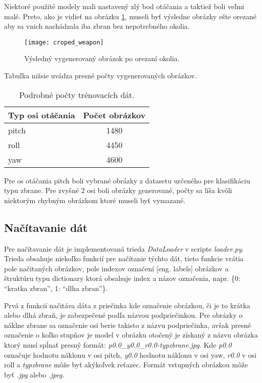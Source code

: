 Niektoré použité modely mali nastavený zlý bod otáčania a taktiež boli veľmi malé.
Preto, ako je vidieť na obrázku \ref{pic:generator3d}, museli byť výsledne obrázky ešte orezané aby sa vnich nachádzala iba zbran bez nepotrebného okolia.

\begin{figure}[H]
    \centering
    \texttt{[image: croped\_weapon]}
    \caption{Výsledný vygenerovaný obrázok po orezaní okolia.}
    \label{pic:generator3d}
\end{figure}

Tabuľka nižsie uvádza presné počty vygenerovaných obrázkov.

\begin{table}[H]
    \centering
    \label{my-label}
    \begin{tabular}{|l|c|}
        \hline
        Typ osi otáčania & \multicolumn{1}{l|}{Počet obrázkov} \\ \hline
        pitch            & 1480                                \\ \hline
        roll             & 4450                                \\ \hline
        yaw              & 4600                                \\ \hline
        \end{tabular}
    \caption{Podrobné počty trénovacích dát.}
\end{table}

Pre os otáčania pitch boli vybrané obrázky z datasetu určeného pre klasifikáciu typu zbrane.
Pre zvyšné 2 osi boli obrázky generované, počty sa líša kvôli niektorým chybným obrázkom ktoré museli byť vymazané.

\subsection{Načítavanie dát}
\label{subsec:nacitaniedat}
Pre načítavanie dát je implementovaná trieda \textit{DataLoader} v scripte \textit{loader.py}.
Trieda obsahuje niekoľko funkcií pre načítanie týchto dát, tieto funkcie vrátia pole načitaných obrázkov, pole indexov označení [eng. labels] obrázkov a
    štruktúru typu dictionary ktorá obsahuje index a názov označenia, napr. \{0: ``kratka zbran'', 1: ``dlha zbran''\}.

Prvá z funkcií načitáva dáta z priečinka kde označenie obrázkou, či je to krátka alebo dlhá zbraň, je zabezpečené podľa názvou podpriečinkou.
Pre obrázky o náklne zbrane sa označenie osi berie takisto z názvu podpriečinka, avšak presné označenie o koľko stupňov je model v obrázku otočený
    je získaný z názvu obrázka ktorý musí spĺnať presný formát: \textit{p0.0\_y0.0\_r0.0-typzbrane.jpg}.
Kde \textit{p0.0} označuje hodnotu náklonu v osi pitch, \textit{y0.0} hodnotu náklonu v osi yaw, \textit{r0.0} v osi roll a \textit{typzbrane} môže byť
    akýkoľvek reťazec.
Formát vstupných obrázkou môže byť \textit{.jpg} alebo \textit{.jpeg}.

